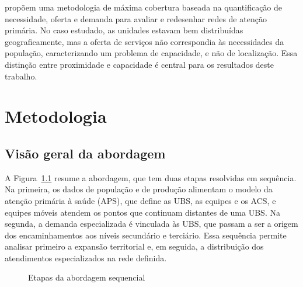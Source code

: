 \documentclass[12pt,a4paper,oneside]{report}
\newcommand{\fonte}[1]{\par\vspace{4pt}{\footnotesize\centering Fonte: #1\par}}
\begin{document}
\citet{elorza2022} propõem uma metodologia de máxima cobertura baseada na quantificação de necessidade,
oferta e demanda para avaliar e redesenhar redes de atenção primária. No caso estudado, as unidades
estavam bem distribuídas geograficamente, mas a oferta de serviços não correspondia às necessidades da
população, caracterizando um problema de capacidade, e não de localização. Essa distinção entre
proximidade e capacidade é central para os resultados deste trabalho.

\chapter{Metodologia}

\section{Visão geral da abordagem}
A Figura~\ref{fig:fluxo} resume a abordagem, que tem duas etapas resolvidas em sequência. Na primeira,
os dados de população e de produção alimentam o modelo da atenção primária à saúde (APS), que define as
UBS, as equipes e os ACS, e equipes móveis atendem os pontos que continuam distantes de uma UBS. Na
segunda, a demanda especializada é vinculada às UBS, que passam a ser a origem dos encaminhamentos aos
níveis secundário e terciário. Essa sequência permite analisar primeiro a expansão territorial e,
em seguida, a distribuição dos atendimentos especializados na rede definida.

\begin{figure}[htbp]\centering
{}
\caption{Etapas da abordagem sequencial}\label{fig:fluxo}
\fonte{Elaboração própria.}
\end{figure}
\end{document}
